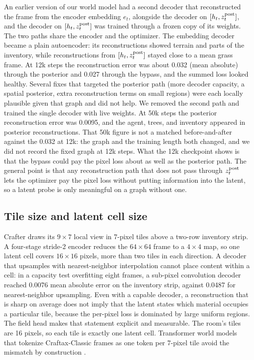 An earlier version of our world model had a second decoder that reconstructed the frame from the encoder embedding $e_t$, alongside the decoder on $[h_t,z^{\mathrm{post}}_t]$, and the decoder on $[h_t, z^{\mathrm{post}}_t]$ was trained through a frozen copy of its weights.
The two paths share the encoder and the optimizer.
The embedding decoder became a plain autoencoder: its reconstructions showed terrain and parts of the inventory, while reconstructions from $[h_t,z^{\mathrm{post}}_t]$ stayed close to a mean grass frame.
At 12k steps the reconstruction error was about 0.032 (mean absolute) through the posterior and 0.027 through the bypass, and the summed loss looked healthy.
Several fixes that targeted the posterior path (more decoder capacity, a spatial posterior, extra reconstruction terms on small regions) were each locally plausible given that graph and did not help.
We removed the second path and trained the single decoder with live weights. At 50k steps the posterior reconstruction error was 0.0095, and the agent, trees, and inventory appeared in posterior reconstructions. That 50k figure is not a matched before-and-after against the 0.032 at 12k: the graph and the training length both changed, and we did not record the fixed graph at 12k steps. What the 12k checkpoint shows is that the bypass could pay the pixel loss about as well as the posterior path.
The general point is that any reconstruction path that does not pass through $z^{\mathrm{post}}_t$ lets the optimizer pay the pixel loss without putting information into the latent, so a latent probe is only meaningful on a graph without one.

\subsection{Tile size and latent cell size}
\label{app:geometry}

Crafter draws its $9\times7$ local view in 7-pixel tiles above a two-row inventory strip.
A four-stage stride-2 encoder reduces the $64\times64$ frame to a $4\times4$ map, so one latent cell covers $16\times16$ pixels, more than two tiles in each direction.
A decoder that upsamples with nearest-neighbor interpolation cannot place content within a cell: in a capacity test overfitting eight frames, a sub-pixel convolution decoder \citep{shi2016subpixel} reached 0.0076 mean absolute error on the inventory strip, against 0.0487 for nearest-neighbor upsampling.
Even with a capable decoder, a reconstruction that is sharp on average does not imply that the latent states which material occupies a particular tile, because the per-pixel loss is dominated by large uniform regions.
The field head makes that statement explicit and measurable.
The room's tiles are 16 pixels, so each tile is exactly one latent cell.
Transformer world models that tokenize Craftax-Classic frames as one token per 7-pixel tile avoid the mismatch by construction \citep{dedieu2025improving}.

